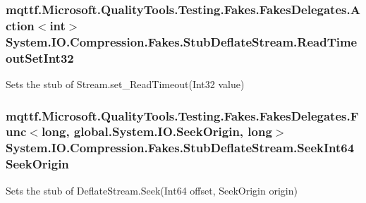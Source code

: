 \hypertarget{class_system_1_1_i_o_1_1_compression_1_1_fakes_1_1_stub_deflate_stream_a74ad60771916d596a15e1144749ce4bb}{
\subsubsection[{Read\-Timeout\-Set\-Int32}]{\setlength{\rightskip}{0pt plus 5cm}mqttf.\-Microsoft.\-Quality\-Tools.\-Testing.\-Fakes.\-Fakes\-Delegates.\-Action$<$int$>$ System.\-I\-O.\-Compression.\-Fakes.\-Stub\-Deflate\-Stream.\-Read\-Timeout\-Set\-Int32}}\label{class_system_1_1_i_o_1_1_compression_1_1_fakes_1_1_stub_deflate_stream_a74ad60771916d596a15e1144749ce4bb}


Sets the stub of Stream.\-set\-\_\-\-Read\-Timeout(\-Int32 value)

\hypertarget{class_system_1_1_i_o_1_1_compression_1_1_fakes_1_1_stub_deflate_stream_a8854eeb786db83fa6cc7dc52484bd2d9}{
\subsubsection[{Seek\-Int64\-Seek\-Origin}]{\setlength{\rightskip}{0pt plus 5cm}mqttf.\-Microsoft.\-Quality\-Tools.\-Testing.\-Fakes.\-Fakes\-Delegates.\-Func$<$long, global.\-System.\-I\-O.\-Seek\-Origin, long$>$ System.\-I\-O.\-Compression.\-Fakes.\-Stub\-Deflate\-Stream.\-Seek\-Int64\-Seek\-Origin}}\label{class_system_1_1_i_o_1_1_compression_1_1_fakes_1_1_stub_deflate_stream_a8854eeb786db83fa6cc7dc52484bd2d9}


Sets the stub of Deflate\-Stream.\-Seek(\-Int64 offset, Seek\-Origin origin)

